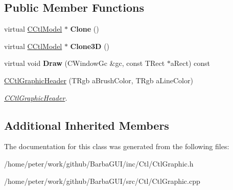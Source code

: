 \subsection*{Public Member Functions}
\begin{DoxyCompactItemize}
\item 
\mbox{\label{classCCtlGraphicHeader_abffa970ad7c3ee275afebd7e595c7b8c}} 
virtual \hyperlink{classCCtlModel}{C\+Ctl\+Model} $\ast$ {\bfseries Clone} ()
\item 
\mbox{\label{classCCtlGraphicHeader_a05e1739009760c0b7ac25dbc24e2cb38}} 
virtual \hyperlink{classCCtlModel}{C\+Ctl\+Model} $\ast$ {\bfseries Clone3D} ()
\item 
\mbox{\label{classCCtlGraphicHeader_a2e00efa368b078c10db3a85b8aeacc88}} 
virtual void {\bfseries Draw} (C\+Window\+Gc \&gc, const T\+Rect $\ast$a\+Rect) const
\item 
\mbox{\label{classCCtlGraphicHeader_a638b8b91ae973c47f75291cd82b3129b}} 
\hyperlink{classCCtlGraphicHeader_a638b8b91ae973c47f75291cd82b3129b}{C\+Ctl\+Graphic\+Header} (T\+Rgb a\+Brush\+Color, T\+Rgb a\+Line\+Color)
\begin{DoxyCompactList}\small\item\em \hyperlink{classCCtlGraphicHeader}{C\+Ctl\+Graphic\+Header}. \end{DoxyCompactList}\end{DoxyCompactItemize}
\subsection*{Additional Inherited Members}


The documentation for this class was generated from the following files\+:\begin{DoxyCompactItemize}
\item 
/home/peter/work/github/\+Barba\+G\+U\+I/inc/\+Ctl/Ctl\+Graphic.\+h\item 
/home/peter/work/github/\+Barba\+G\+U\+I/src/\+Ctl/Ctl\+Graphic.\+cpp\end{DoxyCompactItemize}
